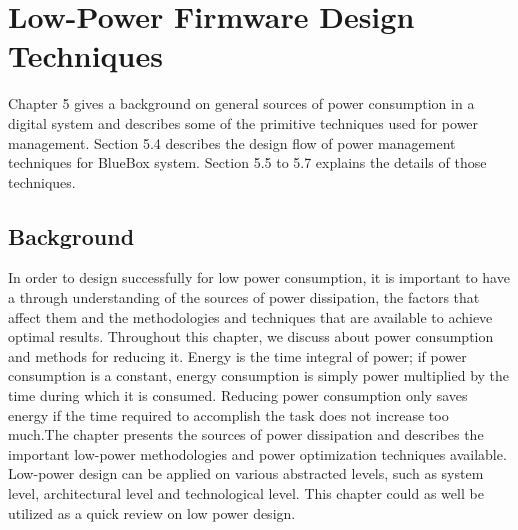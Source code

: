\chapter{Low-Power Firmware Design Techniques}

Chapter 5 gives a background on general sources of power consumption in a digital system and describes some of the primitive techniques used for power management. Section 5.4 describes the design flow of power management techniques for BlueBox system. Section 5.5 to 5.7 explains the details of those techniques.  
\section{Background} In order to design successfully for low power consumption, it is important to have a through understanding of the sources  of power dissipation, the factors that affect them and the methodologies and techniques that are available to achieve optimal results.  
Throughout this chapter, we discuss about power consumption and methods for reducing it. Energy is the time integral of power; if power consumption is a constant, energy 
consumption is simply power multiplied by the time during which it is consumed. 
Reducing power consumption only saves energy if the time required to accomplish the 
task does not increase too much.The chapter presents the sources of power dissipation and describes the important low-power methodologies and power optimization techniques available. Low-power design can be applied on various abstracted levels, such as system level, architectural level and technological level. This chapter could as well be utilized as a quick review on low power design. 

